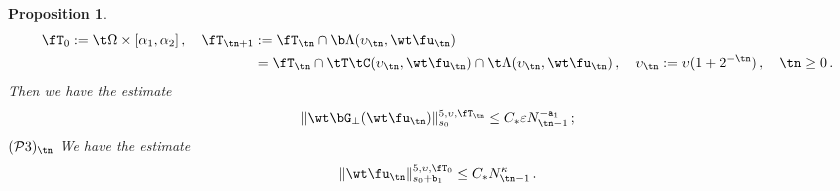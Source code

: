 \documentclass[a4paper,reqno,10pt]{article}
\newtheorem{pro}{Proposition}[section]
\begin{document}
\begin{pro}
\begin{align}\label{nonres.step.NM}
    \fT_{0}:= \t\Omega \times [\alpha_{1},\alpha_{2}] \,, \quad \fT_{\tn+1} &:= \fT_{\tn} \cap \b\Lambda(\upsilon_{\tn},\wt\fu_{\tn}) \\
    & = \fT_{\tn} \cap \tT\tC(\upsilon_{\tn},\wt\fu_{\tn}) \cap \t\Lambda(\upsilon_{\tn},\wt\fu_{\tn})\,, \quad \upsilon_{\tn}:=\upsilon(1+2^{-\tn})\,,  \quad \tn \geq 0 \,.
\end{align}
Then we have the estimate
\begin{equation} \label{stima.F.to.0}
\| \wt\bG_{\perp} (\wt\fu_{\tn})  \|_{s_{0}}^{5,\upsilon,\fT_{\tn}}
\leq C_* \varepsilon N_{\tn - 1 }^{- \mathtt a_1}\, ;
\end{equation}
\noindent $({\mathcal P}3)_{\tn}$
We have the estimate
\begin{equation}\label{stima.alta.NM}
	\| \wt\fu_{\tn} \|_{s_0 + \mathtt b_1}^{5,\upsilon,\fT_{0}}
	\leq C_*  N_{\tn-1}^{\kappa} \,.
\end{equation}
\end{pro}
\end{document}
